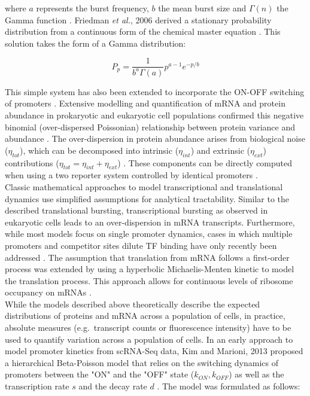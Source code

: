 \noindent where $a$ represents the burst frequency, $b$ the mean burst size and $\Gamma(n)$ the Gamma function \citep{Shahrezaei2008}. Friedman \textit{et al.}, 2006 derived a stationary probability distribution from a continuous form of the chemical master equation \citep{Friedman2006}. This solution takes the form of a Gamma distribution:

\begin{equation}
P_p=\frac{1}{b^a\Gamma(a)}p^{a-1} e^{-p/b}
\end{equation}

\noindent This simple system has also been extended to incorporate the ON-OFF switching of promoters \citep{Jones2014, Shahrezaei2008}. Extensive modelling and quantification of mRNA and protein abundance in prokaryotic and eukaryotic cell populations confirmed this negative binomial (over-dispersed Poissonian) relationship between protein variance and abundance \citep{Ozbudak2002, Bar-Even2006}. The over-dispersion in protein abundance arises from biological noise ($\eta_{tot}$), which can be decomposed into intrinsic ($\eta_{int}$) and extrinsic ($\eta_{ext}$) contributions ($\eta_{tot}=\eta_{int}+\eta_{ext}$) \citep{Swain2002, Fu2016}. These components can be directly computed when using a two reporter system controlled by identical promoters \citep{Elowitz2002}. \\

Classic mathematical approaches to model transcriptional and translational dynamics use simplified assumptions for analytical tractability. Similar to the described translational bursting, transcriptional bursting as observed in eukaryotic cells \citep{Raj2006} leads to an over-dispersion in mRNA transcripts. Furthermore, while most models focus on single promoter dynamics, cases in which multiple promoters and competitor sites dilute TF binding have only recently been addressed \citep{Das2015a}. The assumption that translation from mRNA follows a first-order process was extended by using a hyperbolic Michaelis-Menten kinetic to model the translation process. This approach allows for continuous levels of ribosome occupancy on mRNAs \citep{VanDyken2017}. \\ 

While the models described above theoretically describe the expected distributions of proteins and mRNA across a population of cells, in practice, absolute measures (e.g.~transcript counts or fluorescence intensity) have to be used to quantify variation across a population of cells. In an early approach to model promoter kinetics from \gls{scRNA-Seq} data, Kim and Marioni, 2013 proposed a hierarchical Beta-Poisson model that relies on the switching dynamics of promoters between the "ON" and the "OFF" state ($k_{ON},k_{OFF}$) as well as the transcription rate $s$ and the decay rate $d$ \citep{Kim2013}. The model was formulated as follows:

